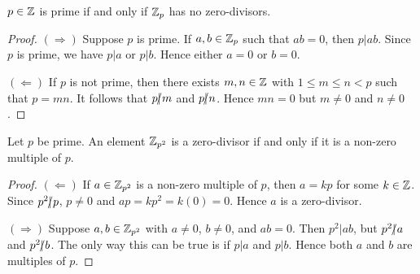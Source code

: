 \documentclass[11pt,fleqn,dvipsnames,usenames]{article}
\begin{document}
\begin{theorem}\label{primepnozerodivisors}
$p\in\mathbb{Z}$ is prime if and only if $\mathbb{Z}_p$ has no zero-divisors.
\end{theorem}
%
\begin{proof}\phantom{-}

$(\Rightarrow)$ Suppose $p$ is prime.  If $a,b\in\mathbb{Z}_p$ such that $ab = 0$, then $p|ab$.  Since $p$ is prime, we have $p|a$ or $p|b$.  Hence either $a=0$ or $b=0$.

$(\Leftarrow)$ If $p$ is not prime, then there exists $m,n\in\mathbb{Z}$ with $1\leq m\leq n < p$ such that $p = mn$.  It follows that $p|\kern-0.9ex{/} m$ and $p|\kern-0.9ex{/} n$.  Hence $mn = 0$ but $m\neq 0$ and $n\neq 0$.
\end{proof}
%
\begin{theorem}
Let $p$ be prime.  An element $\mathbb{Z}_{p^2}$ is a zero-divisor if and only if it is a non-zero multiple of $p$.
\end{theorem}
%
\begin{proof}\phantom{-}

$(\Leftarrow)$ If $a\in\mathbb{Z}_{p^2}$ is a non-zero multiple of $p$, then $a = kp$ for some $k\in\mathbb{Z}$.  Since $p^2|\kern-0.9ex{/} p$, $p\neq 0$ and $ap = kp^2 = k(0) = 0$.  Hence $a$ is a zero-divisor.

$(\Rightarrow)$ Suppose $a,b\in\mathbb{Z}_{p^2}$ with $a\neq0$, $b\neq0$, and $ab = 0$.  Then $p^2|ab$, but $p^2|\kern-0.9ex{/} a$ and $p^2|\kern-0.9ex{/} b$.  The only way this can be true is if $p|a$ and $p|b$.  Hence both $a$ and $b$ are multiples of $p$.
\end{proof}
\vsp
\end{document}
